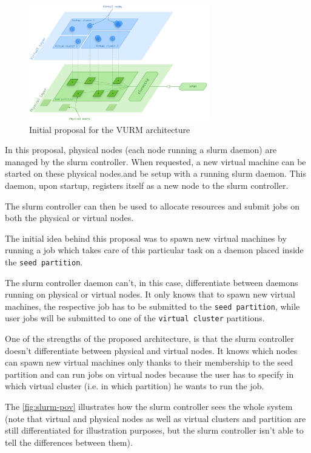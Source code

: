 \begin{figure}[ht]
	\centering
	\includegraphics[width=0.7\textwidth]{figures/vurm-arch-bottom-up}
	\caption{Initial proposal for the VURM architecture}
	\label{fig:vurm-arch-top}
\end{figure}

In this proposal, physical nodes (each node running a \gls{slurm} daemon) are managed by the \gls{slurm} controller. When requested, a new virtual machine can be started on these physical nodes.and be setup with a running slurm daemon. This daemon, upon startup, registers itself as a new node to the \gls{slurm} controller.

The \gls{slurm} controller can then be used to allocate resources and submit jobs on both the physical or virtual nodes.

The initial idea behind this proposal was to spawn new virtual machines by running a job which takes care of this particular task on a daemon placed inside the \texttt{seed partition}.

The \gls{slurm} controller daemon can't, in this case, differentiate between daemons running on physical or virtual nodes. It only knows that to spawn new virtual machines, the respective job has to be submitted to the \texttt{seed partition}, while user jobs will be submitted to one of the \texttt{virtual cluster} partitions.

One of the strengths of the proposed architecture, is that the \gls{slurm} controller doesn't differentiate between physical and virtual nodes. It knows which nodes can spawn new virtual machines only thanks to their membership to the seed partition and can run jobs on virtual nodes because the user has to specify in which virtual cluster (i.e. in which partition) he wants to run the job.

The \autoref{fig:slurm-pov} illustrates how the \gls{slurm} controller sees the whole system (note that virtual and physical nodes as well as virtual clusters and partition are still differentiated for illustration purposes, but the \gls{slurm} controller isn't able to tell the differences between them).

